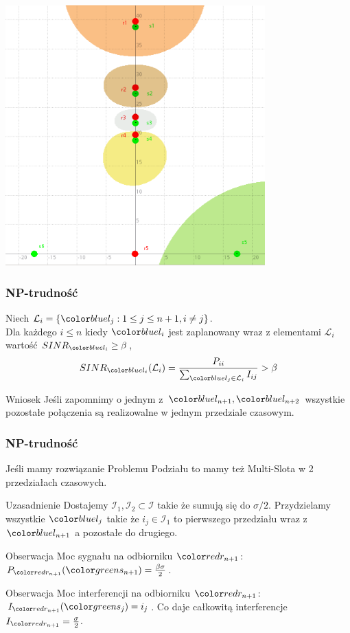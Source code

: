 \documentclass[polish, t,10pt]{beamer}
\begin{document}
\begin{frame}
    \centering
    \includegraphics[width=0.75\textwidth]{pictures/np-placement3.png}
\end{frame}
\begin{frame}
    \frametitle{NP-trudność}
    \begin{lemma}
        Niech $\mathcal{L}_i = \{\lj: 1 \leq j \leq n + 1, i \neq j\}$.\\
        Dla każdego $i \leq n$ kiedy $\li$ jest zaplanowany wraz z elementami $\mathcal{L}_i$ wartość $SINR_\li \ge \beta$,
        $$
            SINR_\li(\mathcal{L}_i) = \frac{P_{ii}}{\sum_{\lj \in \mathcal{L}_i} I_{ij}} > \beta
        $$
    \end{lemma}
    \pause
    \begin{block}{Wniosek}
        Jeśli zapomnimy o jednym z $\lno, \lnt$ wszystkie pozostałe połączenia są realizowalne w jednym przedziale czasowym.
    \end{block}
\end{frame}
\begin{frame}
    \frametitle{NP-trudność}
    Jeśli mamy rozwiązanie Problemu Podziału to mamy też Multi-Slota w 2 przedziałach czasowych.
    \begin{block}{Uzasadnienie}
        Dostajemy $\mathcal{I}_1, \mathcal{I}_2 \subset \mathcal{I}$ takie że sumują się do $\sigma/2$. Przydzielamy wszystkie $\lj$ takie że $i_j \in \mathcal{I}_1$ to pierwszego przedziału wraz z $\lno$ a pozostałe do drugiego.
    \end{block}
    \pause
    \begin{block}{Obserwacja}
        Moc sygnału na odbiorniku $\rno$: $P_\rno(\sno) = \frac{\beta\sigma}{2}$.
    \end{block}
    \pause
    \begin{block}{Obserwacja}
        Moc interferencji na odbiorniku $\rno$: $I_\rno(\sj) = i_j$. Co daje całkowitą interferencje $I_\rno = \frac{\sigma}{2}$.
    \end{block}
\end{frame}
\end{document}
